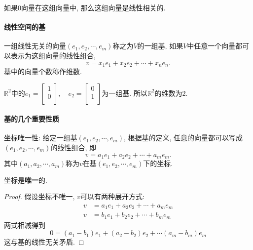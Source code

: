 \begin{example}
    如果$0$向量在这组向量中, 那么这组向量是线性相关的.
\end{example}

\paragraph{线性空间的基}
\begin{definition}
    一组线性无关的向量$(e_1,e_2, \cdots , e_m)$称之为$V$的一组基, 如果$V$中任意一个向量都可以表示为这组向量的线性组合,
    \begin{equation}
      v = x_1e_1+x_2e_2+ \cdots  + x_n e_n.
    \end{equation}
    基中的向量个数称作维数.
\end{definition}

\begin{example}
    $\mathbb{R}^{2}$中的$e_1 = \begin{bmatrix}
     1\\
     0\\
    \end{bmatrix}, \quad e_2 = \begin{bmatrix}
     0\\
     1\\
    \end{bmatrix}$为一组基. 所以$\mathbb{R}^{2}$的维数为$2$.
\end{example}

\paragraph{基的几个重要性质}
坐标唯一性: 给定一组基$(e_1,e_2,\cdots , e_m)$, 根据基的定义, 任意的向量都可以写成$(e_1,e_2,\cdots , e_m)$的线性组合, 即
\begin{equation}
  v = a_1e_1+a_2e_2+ \cdots +a_m e_m.
\end{equation}
其中$(a_1,a_2,\cdots ,a_m)$称为$v$在基$(e_1,e_2,\cdots, e_m)$下的坐标.

坐标是\textbf{唯一}的.
\begin{proof}
    假设坐标不唯一, $v$可以有两种展开方式:
    \begin{equation}
      \begin{aligned}
        v & = a_1 e_1+a_2e_2+ \cdots +a_m e_m 
        \\
        v & = b_1 e_1+b_2e_2+ \cdots +b_m e_m 
      \end{aligned}
    \end{equation}
    两式相减得到
    \begin{equation}
      0 = (a_1-b_1)e_1+(a_2-b_2)e_2+ \cdots (a_m - b_m)e_m
    \end{equation}
    这与基的线性无关矛盾.
\end{proof}

